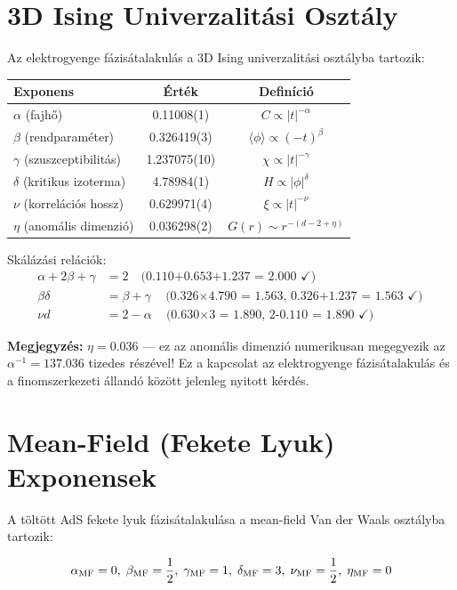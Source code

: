 \documentclass[11pt,a4paper,twoside]{book}
\begin{document}
\section{3D Ising Univerzalitási Osztály}

Az elektrogyenge fázisátalakulás a 3D Ising univerzalitási osztályba tartozik:

\begin{center}
\begin{tabular}{l|c|c}
\textbf{Exponens} & \textbf{Érték} & \textbf{Definíció} \\
\hline
$\alpha$ (fajhő)             & 0.11008(1)  & $C \propto |t|^{-\alpha}$ \\
$\beta$ (rendparaméter)      & 0.326419(3) & $\langle\phi\rangle \propto (-t)^\beta$ \\
$\gamma$ (szuszceptibilitás) & 1.237075(10) & $\chi \propto |t|^{-\gamma}$ \\
$\delta$ (kritikus izoterma)& 4.78984(1)  & $H \propto |\phi|^\delta$ \\
$\nu$ (korrelációs hossz)   & 0.629971(4) & $\xi \propto |t|^{-\nu}$ \\
$\eta$ (anomális dimenzió)   & 0.036298(2) & $G(r) \sim r^{-(d-2+\eta)}$ \\
\end{tabular}
\end{center}

Skálázási relációk:
\begin{align}
\alpha + 2\beta + \gamma &= 2 \quad \text{(0.110+0.653+1.237 = 2.000 ✓)}\\
\beta\delta &= \beta + \gamma \quad \text{(0.326$\times$4.790 = 1.563, 0.326+1.237 = 1.563 ✓)}\\
\nu d &= 2 - \alpha \quad \text{(0.630$\times$3 = 1.890, 2-0.110 = 1.890 ✓)}
\end{align}

\textbf{Megjegyzés:} $\eta = 0.036$ — ez az anomális dimenzió numerikusan megegyezik az $\alpha^{-1} = 137.036$ tizedes részével! Ez a kapcsolat az elektrogyenge fázisátalakulás és a finomszerkezeti állandó között jelenleg nyitott kérdés.

\section{Mean-Field (Fekete Lyuk) Exponensek}

A töltött AdS fekete lyuk fázisátalakulása a mean-field Van der Waals osztályba tartozik:

\begin{equation}
\alpha_{\rm MF}=0,\; \beta_{\rm MF}=\frac{1}{2},\; \gamma_{\rm MF}=1,\; \delta_{\rm MF}=3,\; \nu_{\rm MF}=\frac{1}{2},\; \eta_{\rm MF}=0
\end{equation}
\end{document}
